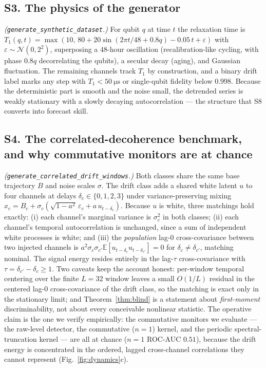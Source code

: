 \documentclass[
  aps,
  prresearch,
  reprint,
  amsmath,
  amssymb,
  nofootinbib,
  floatfix,
]{revtex4-2}
\begin{document}
\subsection*{S3. The physics of the generator}
\emph{(\texttt{generate\_synthetic\_dataset}.)} For qubit $q$ at time $t$ the
relaxation time is
$T_1(q,t)=\max(10,\,80+20\sin(2\pi t/48+0.8q)-0.05\,t+\varepsilon)$ with
$\varepsilon\sim\mathcal{N}(0,2^2)$, superposing a $48$-hour oscillation
(recalibration-like cycling, with phase $0.8q$ decorrelating the qubits), a secular
decay (aging), and Gaussian fluctuation. The remaining channels track $T_1$ by
construction, and a binary drift label marks any step with
$T_1<\SI{50}{\micro\second}$ or single-qubit fidelity below $0.998$. Because the
deterministic part is smooth and the noise small, the detrended series is weakly
stationary with a slowly decaying autocorrelation --- the structure that S8 converts
into forecast skill.

\subsection*{S4. The correlated-decoherence benchmark, and why commutative
monitors are at chance}
\emph{(\texttt{generate\_correlated\_drift\_windows}.)} Both classes share the same
base trajectory $B$ and noise scales $\sigma$. The drift class adds a shared white
latent $u$ to four channels at delays $\delta_c\in\{0,1,2,3\}$ under
variance-preserving mixing
$x_c=B_c+\sigma_c(\sqrt{1-a^2}\,\varepsilon_c+a\,u_{t-\delta_c})$. Because $u$ is
white, three matchings hold exactly: (i) each channel's marginal variance is
$\sigma_c^2$ in both classes; (ii) each channel's temporal autocorrelation is
unchanged, since a sum of independent white processes is white; and (iii) the
\emph{population} lag-$0$ cross-covariance between two injected channels is
$a^2\sigma_c\sigma_{c'}\mathbb{E}[u_{t-\delta_c}u_{t-\delta_{c'}}]=0$ for
$\delta_c\neq\delta_{c'}$, matching nominal. The signal energy resides entirely in
the lag-$\tau$ cross-covariance with $\tau=\delta_{c'}-\delta_c\ge1$. Two caveats
keep the account honest: per-window temporal centering over the finite $L=32$ window
leaves a small $O(1/L)$ residual in the centered lag-$0$ cross-covariance of the
drift class, so the matching is exact only in the stationary limit; and
Theorem~\ref{thm:blind} is a statement about \emph{first-moment} discriminability,
not about every conceivable nonlinear statistic. The operative claim is the one we
verify empirically: the commutative monitors we evaluate --- the raw-level detector,
the commutative ($n{=}1$) kernel, and the periodic spectral-truncation kernel --- are
all at chance ($n{=}1$ ROC-AUC $0.51$), because the drift energy is concentrated in
the ordered, lagged cross-channel correlations they cannot represent
(Fig.~\ref{fig:dynamics}c).
\end{document}
